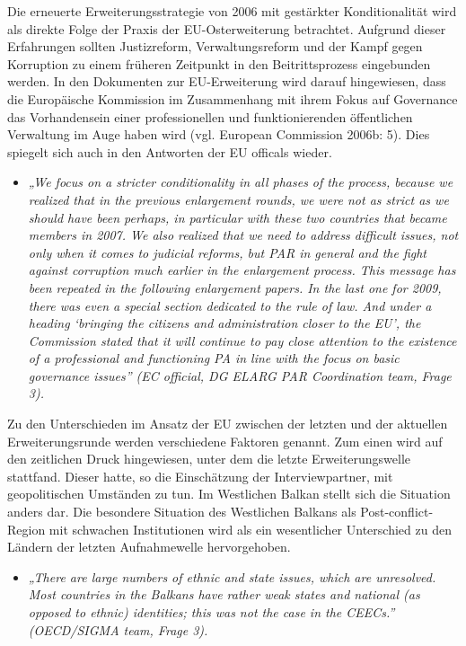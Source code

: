 Die erneuerte Erweiterungsstrategie von 2006 mit gestärkter Konditionalität wird als direkte Folge der Praxis der EU-Osterweiterung betrachtet. Aufgrund dieser Erfahrungen sollten Justizreform, Verwaltungsreform und der Kampf gegen Korruption zu einem früheren Zeitpunkt in den Beitrittsprozess eingebunden werden. In den Dokumenten zur EU-Erweiterung wird darauf hingewiesen, dass die Europäische Kommission im Zusammenhang mit ihrem Fokus auf Governance das Vorhandensein einer professionellen und funktionierenden öffentlichen Verwaltung im Auge haben wird (vgl. European Commission 2006b: 5). Dies spiegelt sich auch in den Antworten der EU officals wieder.
\begin{itemize}[label={}]
\item \textit{„We focus on a stricter conditionality in all phases of the process, because we realized that in the previous enlargement rounds, we were not as strict as we should have been perhaps, in particular with these two countries that became members in 2007. We also realized that we need to address difficult issues, not only when it comes to judicial reforms, but PAR in general and the fight against corruption much earlier in the enlargement process. This message has been repeated in the following enlargement papers. In the last one for 2009, there was even a special section dedicated to the rule of law. And under a heading ‘bringing the citizens and administration closer to the EU’, the Commission stated that it will continue to pay close attention to the existence of a professional and functioning PA in line with the focus on basic governance issues” (EC official, DG ELARG PAR Coordination team, Frage 3). }
\end{itemize}
Zu den Unterschieden im Ansatz der EU zwischen der letzten und der aktuellen Erweiterungsrunde werden verschiedene Faktoren genannt. Zum einen wird auf den zeitlichen Druck hingewiesen, unter dem die letzte Erweiterungswelle stattfand. Dieser hatte, so die Einschätzung der Interviewpartner, mit geopolitischen Umständen zu tun. Im Westlichen Balkan stellt sich die Situation anders dar. Die besondere Situation des Westlichen Balkans als Post-conflict-Region mit schwachen Institutionen wird als ein wesentlicher Unterschied zu den Ländern der letzten Aufnahmewelle hervorgehoben.
\begin{itemize}[label={}]
\item \textit{„There are large numbers of ethnic and state issues, which are unresolved. Most countries in the Balkans have rather weak states and national (as opposed to ethnic) identities; this was not the case in the CEECs.” (OECD/SIGMA team, Frage 3).}
\end{itemize}
